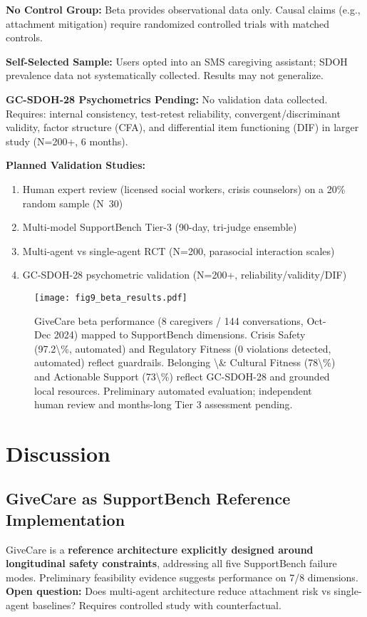 \documentclass{article}
\begin{document}
\textbf{No Control Group:} Beta provides observational data only. Causal claims (e.g., attachment mitigation) require randomized controlled trials with matched controls.

\textbf{Self-Selected Sample:} Users opted into an SMS caregiving assistant; SDOH prevalence data not systematically collected. Results may not generalize.

\textbf{GC{-}SDOH{-}28 Psychometrics Pending:} No validation data collected. Requires: internal consistency, test-retest reliability, convergent/discriminant validity, factor structure (CFA), and differential item functioning (DIF) in larger study (N=200+, 6 months).

\textbf{Planned Validation Studies:}
\begin{enumerate}
    \item Human expert review (licensed social workers, crisis counselors) on a 20\% random sample (N~30)
    \item Multi-model SupportBench Tier-3 (90-day, tri-judge ensemble)
    \item Multi-agent vs single-agent RCT (N=200, parasocial interaction scales)
    \item GC{-}SDOH{-}28 psychometric validation (N=200+, reliability/validity/DIF)
\end{enumerate}

%
\begin{figure}[htbp]%
\centering%
\texttt{[image: fig9\_beta\_results.pdf]}%
\caption{GiveCare beta performance (8 caregivers / 144 conversations, Oct-Dec 2024) mapped to SupportBench dimensions. Crisis Safety (97.2\textbackslash{}\%, automated) and Regulatory Fitness (0 violations detected, automated) reflect guardrails. Belonging \textbackslash{}\& Cultural Fitness (78\textbackslash{}\%) and Actionable Support (73\textbackslash{}\%) reflect GC{-}SDOH{-}28 and grounded local resources. Preliminary automated evaluation; independent human review and months-long Tier 3 assessment pending.}%
\label{fig:beta}%
\end{figure}%
\section{Discussion}%
\label{sec:Discussion}%
%
\subsection{GiveCare as SupportBench Reference Implementation}%
\label{subsec:GiveCareasSupportBenchReferenceImplementation}%
GiveCare is a \textbf{reference architecture explicitly designed around longitudinal safety constraints}, addressing all five SupportBench failure modes. Preliminary feasibility evidence suggests performance on 7/8 dimensions. \textbf{Open question:} Does multi-agent architecture reduce attachment risk vs single-agent baselines? Requires controlled study with counterfactual.
\end{document}
